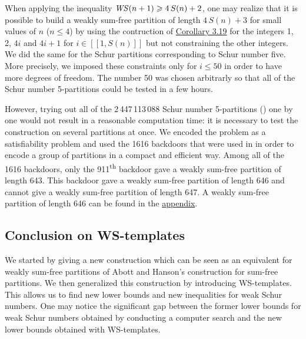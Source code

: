 When applying the inequality \(\mathit{WS}(n+1) \geqslant 4 \, S(n) + 2\), one may realize that it is possible to build a weakly 
sum-free partition of length \(4 \, S(n) + 3\) for small values of \(n\) (\(n \leqslant 4\)) by using the contruction of 
\hyperref[Corollary3.19]{Corollary 3.19} for the integers 1, 2, \(4i\) and \(4i+1\) for \(i \in [\![1, S(n)]\!]\) but not 
constraining the other integers. We did the same for the Schur partitions corresponding to Schur number five. More precisely, 
we imposed these constraints only for \(i \leqslant 50\) in order to have more degrees of freedom. The number 50 was chosen 
arbitrarly so that all of the Schur number 5-partitions could be tested in a few hours.

However, trying out all of the 2\,447\,113\,088 Schur number 5-partitions (\cite{Heule2017}) one by one would not result in a 
reasonable computation time: it is necessary to test the construction on several partitions at once. We encoded the problem as a 
satisfiability problem and used the 1616 backdoors that were used in \cite{Heule2017} in order to encode a group of partitions in 
a compact and efficient way. Among all of the 1616 backdoors, only the 911\textsuperscript{th} backdoor gave a weakly sum-free 
partition of length 643. This backdoor gave a weakly sum-free partition of length 646 and cannot give a weakly sum-free 
partition of length 647. A weakly sum-free partition of length 646 can be found in the \hyperref[WS(6)]{appendix}.


\subsection{Conclusion on WS-templates}

\qquad We started by giving a new construction which can be seen as an equivalent for weakly sum-free partitions of Abott
and Hanson's construction for sum-free partitions. We then generalized this construction by introducing WS-templates. This
allows us to find new lower bounds and new inequalities for weak Schur numbers. One may notice the significant gap
between the former lower bounds for weak Schur numbers obtained by conducting a computer search and the new lower bounds
obtained with WS-templates.
